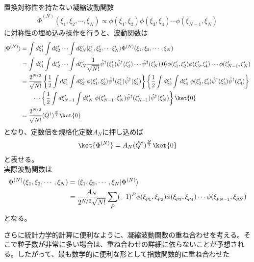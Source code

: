 \documentclass[dvipdfmx, 11pt, a4paper]{jsarticle}
\numberwithin{equation}{section}
\theoremstyle{definition}
\begin{document}
    \begin{derivationBox}
        置換対称性を持たない凝縮波動関数
        \begin{align}
            \tilde{\Phi}^{(N)} (\xi_1,\xi_2,\cdots,\xi_N) \propto \phi(\xi_1,\xi_2) \phi(\xi_3,\xi_4)\cdots \phi(\xi_{N-1},\xi_N)  
        \end{align}
        に対称性の埋め込み操作を行うと、波動関数は
        \begin{align}
            |\Phi^{(N)} \rangle &= \int d\xi_1' \int d\xi_2' \cdots \int d\xi_N' |\xi_1',\xi_2',\cdots\xi_N' \rangle \tilde{\Phi}^{(N)} (\xi_1,\xi_2,\cdots,\xi_N) \notag \\
            &= \int d\xi_1' \int d\xi_2' \cdots \int d\xi_N' \frac{1}{\sqrt{N!}} \hat{\psi}^\dagger (\xi_1') \hat{\psi}^\dagger (\xi_2')\cdots \hat{\psi}^\dagger (\xi_N') |0\rangle \phi(\xi_1',\xi_2') \phi(\xi_3',\xi_4')\cdots \phi(\xi_{N-1}',\xi_N')  \notag \\
            &= \frac{2^{N/2}}{\sqrt{N!}}\left\{ \frac{1}{2}\int d\xi_1'\int d\xi_2' \ \phi(\xi_1',\xi_2') \hat{\psi}^\dagger(\xi_1') \hat{\psi}^\dagger(\xi_2') \right\} \left\{ \frac{1}{2} \int d\xi_3'\int d\xi_4' \ \phi(\xi_3',\xi_4') \hat{\psi}^\dagger(\xi_3') \hat{\psi}^\dagger(\xi_4') \right\} \notag \\
            &\ \ \ \ \ \ \cdots \left\{ \frac{1}{2} \int d\xi_{N-1}'\int d\xi_N' \ \phi(\xi_{N-1}',\xi_N') \hat{\psi}^\dagger(\xi_{N-1}') \hat{\psi}^\dagger(\xi_N') \right\} \ket{0} \notag \\
            &= \frac{2^{N/2}}{\sqrt{N!}} (\hat{Q}^\dagger)^{\frac{N}{2}} \ket{0}
        \end{align}
        となり、定数倍を規格化定数$A_N$に押し込めば
        \begin{align}
            \ket{\Phi^{(N)}} = A_N (\hat{Q}^\dagger)^{\frac{N}{2}} \ket{0}
        \end{align}
        と表せる。\\
        実際波動関数は
        \begin{align}
            \Phi^{(N)}(\xi_1,\xi_2,\cdots,\xi_N) &= \langle \xi_1,\xi_2,\cdots,\xi_N| \Phi^{(N)} \rangle \notag \\
            &= \frac{A_N}{2^{N/2}\sqrt{N!}} \sum_{\hat{P}} (-1)^P \phi(\xi_{p_1},\xi_{p_2}) \phi(\xi_{p_3},\xi_{p_4})\cdots \phi(\xi_{p_{{N-1}}},\xi_{p_N})  
        \end{align}
        となる。
    \end{derivationBox}
    さらに統計力学的計算に便利なように、凝縮波動関数の重ね合わせを考える。そこで粒子数が非常に多い場合は、重ね合わせの詳細に依らないことが予想される。したがって、最も数学的に便利な形として指数関数的に重ね合わせた
\end{document}
